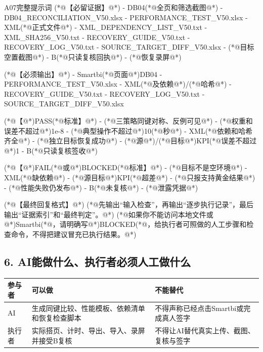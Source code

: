 \documentclass[UTF8,openany,zihao=-4]{ctexbook}
\renewcommand{\_}{\textunderscore\allowbreak}
\begin{document}
\begin{PromptBox}{A07完整提示词}
(*@{\promptcjk 【必留证据】}@*)
- DB04(*@{\promptcjk 全页和筛选截图}@*)
- DB04_RECONCILIATION_V50.xlsx
- PERFORMANCE_TEST_V50.xlsx
- XML(*@{\promptcjk 正式文件}@*)
- XML_DEPENDENCY_LIST_V50.txt
- XML_SHA256_V50.txt
- RECOVERY_GUIDE_V50.txt
- RECOVERY_LOG_V50.txt
- SOURCE_TARGET_DIFF_V50.xlsx
- (*@{\promptcjk 目标空置截图}@*)
- B(*@{\promptcjk 只读复核回执}@*)
- (*@{\promptcjk 恢复录屏}@*)

(*@{\promptcjk 【必须输出】}@*)
- Smartbi(*@{\promptcjk 页面}@*)DB04
- PERFORMANCE_TEST_V50.xlsx
- XML(*@{\promptcjk 及依赖}@*)/(*@{\promptcjk 哈希}@*)
- RECOVERY_GUIDE_V50.txt
- RECOVERY_LOG_V50.txt
- SOURCE_TARGET_DIFF_V50.xlsx

(*@{\promptcjk 【}@*)PASS(*@{\promptcjk 标准】}@*)
- (*@{\promptcjk 三策略同键对称、反例可见}@*)
- (*@{\promptcjk 权重和误差不超过}@*)1e-8
- (*@{\promptcjk 典型操作不超过}@*)10(*@{\promptcjk 秒}@*)
- XML(*@{\promptcjk 依赖和哈希齐全}@*)
- (*@{\promptcjk 独立目标恢复成功}@*)
- (*@{\promptcjk 源}@*)/(*@{\promptcjk 目标}@*)KPI(*@{\promptcjk 误差不超过}@*)1%
- B(*@{\promptcjk 只读复核签收}@*)

(*@{\promptcjk 【}@*)FAIL(*@{\promptcjk 或}@*)BLOCKED(*@{\promptcjk 标准】}@*)
- (*@{\promptcjk 目标不是空环境}@*)
- XML(*@{\promptcjk 缺依赖}@*)
- (*@{\promptcjk 源目标}@*)KPI(*@{\promptcjk 超差}@*)
- (*@{\promptcjk 只报支持黄金结果}@*)
- (*@{\promptcjk 性能失败仍发布}@*)
- B(*@{\promptcjk 未复核}@*)
- (*@{\promptcjk 泄露凭据}@*)

(*@{\promptcjk 【最终回复格式】}@*)
(*@{\promptcjk 先输出“输入检查”，再输出“逐步执行记录”，最后输出“证据索引”和“最终判定”。}@*)
(*@{\promptcjk 如果你不能访问本地文件或}@*)Smartbi(*@{\promptcjk ，请明确写}@*)BLOCKED(*@{\promptcjk ，给执行者可照做的人工步骤和检查命令，不得把建议冒充已执行结果。}@*)
\end{PromptBox}

\subsection*{6. AI能做什么、执行者必须人工做什么}
\noindent\begin{tabularx}{\textwidth}{@{}p{}XX@{}}
\toprule
\textbf{参与者} & \textbf{可以做} & \textbf{不能替代} \\
\midrule
AI & 生成同键比较、性能模板、依赖清单和恢复检查脚本 & 不得声称已经点击Smartbi或完成真人签字 \\
执行者 & 实际搭页、计时、导出、导入、录屏并接受B复核 & 不得让AI替代真实上传、截图、复核与签字 \\
\bottomrule
\end{tabularx}
\end{document}
